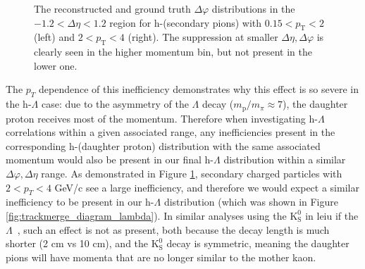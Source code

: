 \begin{figure}[ht]
\begin{minipage}{0.48\textwidth}
	\end{minipage}
	\caption{The reconstructed and ground truth $\Delta\varphi$  distributions in the $-1.2 < \Delta\eta < 1.2$ region for h-(secondary pions) with $0.15 < p_{\text{T}} < 2$ (left) and $2 < p_{\text{T}} < 4$ (right). The suppression at smaller $\Delta\eta, \Delta\varphi$ is clearly seen in the higher momentum bin, but not present in the lower one.}
	\label{fig:trackmerge_pt_dependence}
\end{figure}

The $p_{T}$ dependence of this inefficiency demonstrates why this effect is so severe in the h-$\Lambda$ case: due to the asymmetry of the $\Lambda$ decay ($m_{\text{p}}/m_{\pi} \approx 7$), the daughter proton receives most of the momentum. Therefore when investigating h-$\Lambda$ correlations within a given associated \pt range, any inefficiencies present in the corresponding h-(daughter proton) distribution with the same associated momentum would also be present in our final h-$\Lambda$ distribution within a similar $\Delta\varphi, \Delta\eta$ range. As demonstrated in Figure \ref{fig:trackmerge_pt_dependence}, secondary charged particles with $2 < p_{T} < 4$ GeV/c see a large inefficiency, and therefore we would expect a similar inefficiency to be present in our h-$\Lambda$ distribution (which was shown in Figure \ref{fig:trackmerge_diagram_lambda}). In similar analyses using the $\text{K}^{0}_{\text{S}}$ in leiu if the $\Lambda$~\cite{Lambda1}, such an effect is not as present, both because the decay length is much shorter (2 cm vs 10 cm), and the $\text{K}^{0}_{\text{S}}$ decay is symmetric, meaning the daughter pions will have momenta that are no longer similar to the mother kaon.

